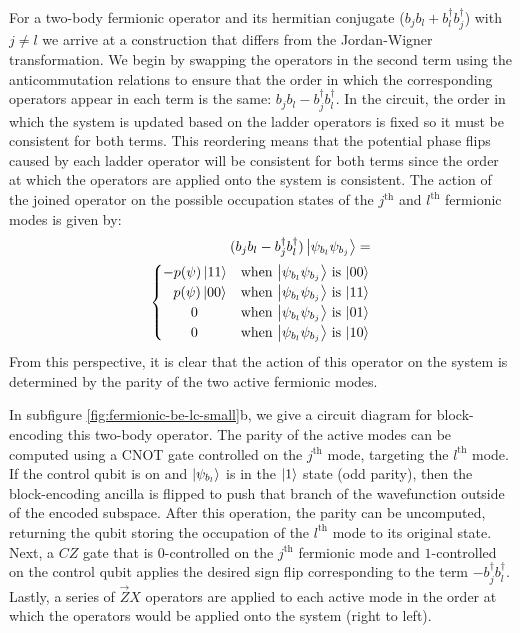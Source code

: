 For a two-body fermionic operator and its hermitian conjugate ($b_j b_l + b_l^\dagger b_j^\dagger$) with $j \neq l$ we arrive at a construction that differs from the Jordan-Wigner transformation.
We begin by swapping the operators in the second term using the anticommutation relations to ensure that the order in which the corresponding operators appear in each term is the same: $b_j b_l - b_j^\dagger b_l^\dagger$.
In the circuit, the order in which the system is updated based on the ladder operators is fixed so it must be consistent for both terms.
This reordering means that the potential phase flips caused by each ladder operator will be consistent for both terms since the order at which the operators are applied onto the system is consistent.
The action of the joined operator on the possible occupation states of the $j^\text{th}$ and $l^\text{th}$ fermionic modes is given by:
\begin{equation}
    \begin{split}
        (b_j b_l - b_j^\dagger b_l^\dagger) \ket{\psi_{b_l} \psi_{b_j}} = \\
        \begin{cases} 
            - p(\psi) \ket{11} & \text{when $\ket{\psi_{b_l} \psi_{b_j}}$ is $\ket{00}$} \\
            \hspace{0.75em} p(\psi) \ket{00} & \text{when $\ket{\psi_{b_l} \psi_{b_j}}$ is $\ket{11}$} \\
            \hspace{2em} 0 & \text{when $\ket{\psi_{b_l} \psi_{b_j}}$ is $\ket{01}$} \\
            \hspace{2em} 0 & \text{when $\ket{\psi_{b_l} \psi_{b_j}}$ is $\ket{10}$} \\
        \end{cases}
    \end{split}
\end{equation}
From this perspective, it is clear that the action of this operator on the system is determined by the parity of the two active fermionic modes.

In subfigure \ref{fig:fermionic-be-lc-small}b, we give a circuit diagram for block-encoding this two-body operator.
The parity of the active modes can be computed using a CNOT gate controlled on the $j^\text{th}$ mode, targeting the $l^\text{th}$ mode.
If the control qubit is on and $\ket{\psi_{b_l}}$ is in the $\ket{1}$ state (odd parity), then the block-encoding ancilla is flipped to push that branch of the wavefunction outside of the encoded subspace.
After this operation, the parity can be uncomputed, returning the qubit storing the occupation of the $l^\text{th}$ mode to its original state.
Next, a $CZ$ gate that is $0$-controlled on the $j^\text{th}$ fermionic mode and $1$-controlled on the control qubit applies the desired sign flip corresponding to the term $- b_j^\dagger b_l^\dagger$.
Lastly, a series of $\vec{Z}X$ operators are applied to each active mode in the order at which the operators would be applied onto the system (right to left).

